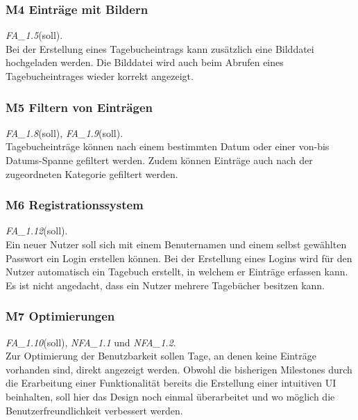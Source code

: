 \subsubsection{M4 Einträge mit Bildern}
\emph{FA\_1.5}(soll).\\
Bei der Erstellung eines Tagebucheintrags kann zusätzlich eine Bilddatei hochgeladen werden. Die Bilddatei wird auch beim Abrufen eines Tagebucheintrages wieder korrekt angezeigt.

\subsubsection{M5 Filtern von Einträgen}
\emph{FA\_1.8}(soll), \emph{FA\_1.9}(soll).\\
Tagebucheinträge können nach einem bestimmten Datum oder einer von-bis Datums-Spanne gefiltert werden. Zudem können Einträge auch nach der zugeordneten Kategorie gefiltert werden.

\subsubsection{M6 Registrationssystem}
\emph{FA\_1.12}(soll).\\
Ein neuer Nutzer soll sich mit einem Benuternamen und einem selbst gewählten Passwort ein Login erstellen können. Bei der Erstellung eines Logins wird für den Nutzer automatisch ein Tagebuch erstellt, in welchem er Einträge erfassen kann. Es ist nicht angedacht, dass ein Nutzer mehrere Tagebücher besitzen kann.

\subsubsection{M7 Optimierungen}
\emph{FA\_1.10}(soll), \emph{NFA\_1.1} und \emph{NFA\_1.2}.\\
Zur Optimierung der Benutzbarkeit sollen Tage, an denen keine Einträge vorhanden sind, direkt angezeigt werden. Obwohl die bisherigen Milestones durch die Erarbeitung einer Funktionalität bereits die Erstellung einer intuitiven UI beinhalten, soll hier das Design noch einmal überarbeitet und wo möglich die Benutzerfreundlichkeit verbessert werden.
